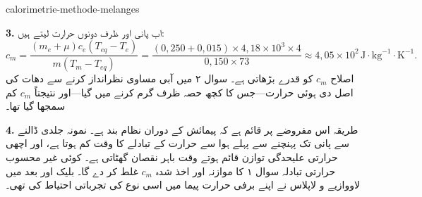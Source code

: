 \begin{exo}{calorimetrie-methode-melanges}
\begin{solution}
\textbf{3.} اب پانی اور ظرف دونوں حرارت لیتے ہیں:
\[
c_m=\frac{(m_e+\mu)c_e(T_{eq}-T_e)}{m(T_m-T_{eq})}
=\frac{(0{,}250+0{,}015)\times4{,}18\times10^3\times4}{0{,}150\times73}
\approx4{,}05\times10^2\,\text{J}\!\cdot\!\text{kg}^{-1}\!\cdot\!\text{K}^{-1}.
\]
اصلاح $c_m$ کو قدرے بڑھاتی ہے۔ سوال ۲ میں آبی مساوی نظرانداز کرنے سے دھات کی اصل دی ہوئی حرارت—جس کا کچھ حصہ ظرف گرم کرنے میں گیا—اور نتیجتاً $c_m$ کم سمجھا گیا تھا۔

\textbf{4.} طریقہ اس مفروضے پر قائم ہے کہ پیمائش کے دوران نظام بند ہے۔ نمونہ جلدی ڈالنے سے پانی تک پہنچنے سے پہلے ہوا سے حرارت کے تبادلے کا وقت کم ہوتا ہے، اور اچھی حرارتی علیحدگی توازن قائم ہوتے وقت باہر نقصان گھٹاتی ہے۔ کوئی غیر محسوب حرارتی تبادلہ سوال ۱ کا موازنہ اور اخذ شدہ $c_m$ غلط کر دے گا۔ بلیک اور بعد میں لاووازیے و لاپلاس نے اپنے برفی حرارت پیما میں اسی نوع کی تجرباتی احتیاط کی تھی۔
\end{solution}
\end{exo}

